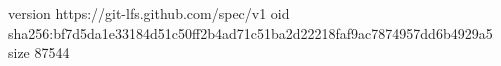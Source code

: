 version https://git-lfs.github.com/spec/v1
oid sha256:bf7d5da1e33184d51c50ff2b4ad71c51ba2d22218faf9ac7874957dd6b4929a5
size 87544
